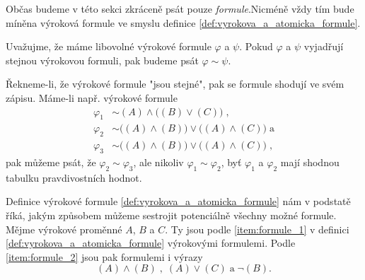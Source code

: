 \begin{remark}
    Občas budeme v této sekci zkráceně psát pouze \emph{formule}.\linebreak Nicméně vždy tím bude míněna výroková formule ve smyslu definice \ref{def:vyrokova_a_atomicka_formule}.
\end{remark}

\begin{convention}
    \label{conv:rovnost_logickych_formuli}
    Uvažujme, že máme libovolné výrokové formule $\varphi$ a $\psi$. Pokud $\varphi$ a $\psi$ vyjadřují stejnou výrokovou formuli, pak budeme psát $\varphi\sim\psi$.
\end{convention}

Řekneme-li, že výrokové formule "jsou stejné", pak se formule shodují ve svém zápisu. Máme-li např. výrokové formule
\begin{align*}
    \varphi_1&\sim (A) \land \big((B) \lor (C)\big)\; ,\\
    \varphi_2&\sim \big((A) \land (B)\big) \lor \big((A) \land (C)\big )\;\text{a}\\
    \varphi_3&\sim \big((A) \land (B)\big) \lor \big((A) \land (C)\big)\; ,
\end{align*}
pak můžeme psát, že $\varphi_2\sim\varphi_3$, ale nikoliv $\varphi_1\sim\varphi_2$, byť $\varphi_1$ a $\varphi_2$ mají shodnou tabulku pravdivostních hodnot.\par

Definice výrokové formule \ref{def:vyrokova_a_atomicka_formule} nám v podstatě říká, jakým způsobem můžeme sestrojit potenciálně všechny možné formule. Mějme výrokové proměnné $A$, $B$ a $C$. Ty jsou podle \ref{item:formule_1} v definici \ref{def:vyrokova_a_atomicka_formule} výrokovými formulemi. Podle \ref{item:formule_2} jsou pak formulemi i výrazy
\begin{equation}\label{eq:vyrokove_formule_z_definice}
    (A) \land (B)\;,\;(A) \lor (C)\;\text{a}\;\neg(B).
\end{equation}

